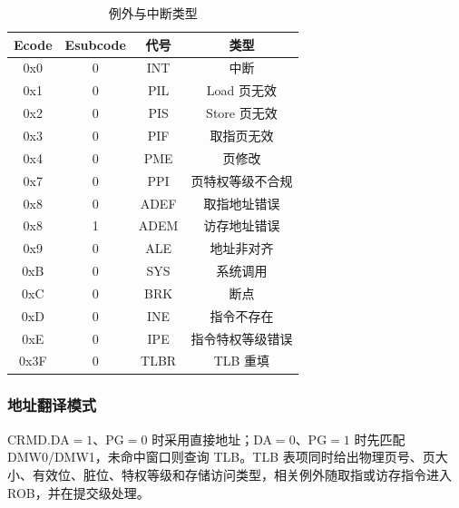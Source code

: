 \begin{table}[H]
\centering
\caption{例外与中断类型}
\label{tab:excp}
\small
\begin{tabular}{cccc}
\toprule
Ecode & Esubcode & 代号 & 类型 \\
\midrule
0x0 & 0 & INT & 中断 \\
0x1 & 0 & PIL & Load 页无效 \\
0x2 & 0 & PIS & Store 页无效 \\
0x3 & 0 & PIF & 取指页无效 \\
0x4 & 0 & PME & 页修改 \\
0x7 & 0 & PPI & 页特权等级不合规 \\
0x8 & 0 & ADEF & 取指地址错误 \\
0x8 & 1 & ADEM & 访存地址错误 \\
0x9 & 0 & ALE & 地址非对齐 \\
0xB & 0 & SYS & 系统调用 \\
0xC & 0 & BRK & 断点 \\
0xD & 0 & INE & 指令不存在 \\
0xE & 0 & IPE & 指令特权等级错误 \\
0x3F & 0 & TLBR & TLB 重填 \\
\bottomrule
\end{tabular}
\end{table}

\subsubsection{地址翻译模式}

CRMD.DA$=1$、PG$=0$ 时采用直接地址；DA$=0$、PG$=1$ 时先匹配 DMW0/DMW1，未命中窗口则查询 TLB。TLB 表项同时给出物理页号、页大小、有效位、脏位、特权等级和存储访问类型，相关例外随取指或访存指令进入 ROB，并在提交级处理。
